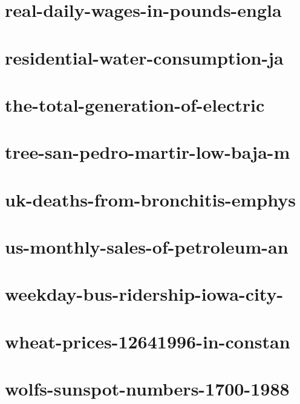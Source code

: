 \documentclass[twoside]{article}
\begin{document}
    

\section{real-daily-wages-in-pounds-engla}

    

\section{residential-water-consumption-ja}

    

\section{the-total-generation-of-electric}

    

\section{tree-san-pedro-martir-low-baja-m}

    

\section{uk-deaths-from-bronchitis-emphys}

    

\section{us-monthly-sales-of-petroleum-an}

    

\section{weekday-bus-ridership-iowa-city-}

    

\section{wheat-prices-12641996-in-constan}

    

\section{wolfs-sunspot-numbers-1700-1988}

    
\end{document}
